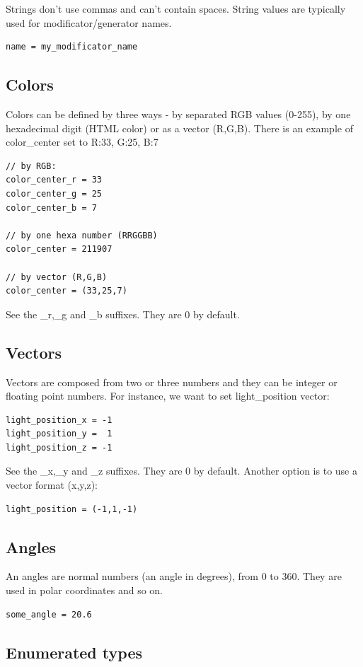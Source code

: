 \documentclass[9pt]{article}
\begin{document}
Strings don't use commas and can't contain spaces. String values are typically 
used for modificator/generator names.
\begin{verbatim}
name = my_modificator_name
\end{verbatim}

\subsection{Colors}
Colors can be defined by three ways - by separated RGB values (0-255),
by one hexadecimal digit (HTML color) or as a vector (R,G,B). There is an example
of color\_center set to R:33, G:25, B:7
\begin{verbatim}
// by RGB:
color_center_r = 33
color_center_g = 25
color_center_b = 7

// by one hexa number (RRGGBB)
color_center = 211907

// by vector (R,G,B)
color_center = (33,25,7) 
\end{verbatim}
See the \_r,\_g and \_b suffixes. They are 0 by default.

\subsection{Vectors}

Vectors are composed from two or three numbers and they
can be integer or floating point numbers. For instance, we want to 
set light\_position vector:
\begin{verbatim}
light_position_x = -1
light_position_y =  1
light_position_z = -1
\end{verbatim}
See the \_x,\_y and \_z suffixes. They are 0 by default. Another option is
to use a vector format (x,y,z):
\begin{verbatim}
light_position = (-1,1,-1)
\end{verbatim}

\subsection{Angles}

An angles are normal numbers (an angle in degrees), from 0 to 360. 
They are used in polar coordinates and so on.
\begin{verbatim}
some_angle = 20.6
\end{verbatim}

\subsection{Enumerated types}
\end{document}
